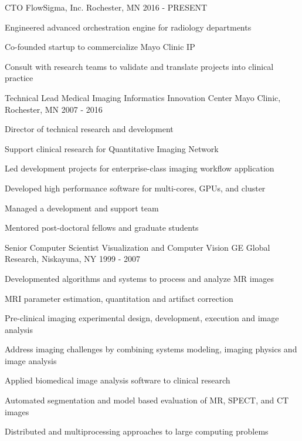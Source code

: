 \begin{cventries}
  \cventry
      {CTO} %
      {FlowSigma, Inc.} %
      {Rochester, MN} %
      {2016 - PRESENT} %
      { 
        \begin{cvitems}
        \item Engineered advanced orchestration engine for radiology departments
        \item Co-founded startup to commercialize Mayo Clinic IP
        \item Consult with research teams to validate and translate projects into clinical practice
        \end{cvitems}
      }
      
  \cventry
      {Technical Lead} %
      {Medical Imaging Informatics Innovation Center} %
      {Mayo Clinic, Rochester, MN} %
      {2007 - 2016} %
      { 
        \begin{cvitems}
        \item{Director of technical research and development}
        \item{Support clinical research for Quantitative Imaging Network}
        \item{Led development projects for enterprise-class imaging workflow application}
        \item{Developed high performance software for multi-cores, GPUs, and cluster}
        \item{Managed a development and support team}
        \item{Mentored post-doctoral fellows and graduate students}
        \end{cvitems}
      }
              
  \cventry
      {Senior Computer Scientist} %
      {Visualization and Computer Vision} %
      {GE Global Research, Niskayuna, NY} %
      {1999 - 2007} %
      { 
        \begin{cvitems}
        \item Developmented algorithms and systems to process and analyze MR images
        \item MRI parameter estimation, quantitation and artifact correction
        \item Pre-clinical imaging experimental design, development, execution and image analysis
        \item Address imaging challenges by combining systems modeling, imaging physics and image analysis
        \item Applied biomedical image analysis software to clinical research
        \item Automated segmentation and model based evaluation of MR, SPECT, and CT images
        \item Distributed and multiprocessing approaches to large computing problems
        \end{cvitems}
      }
                  
\end{cventries}

